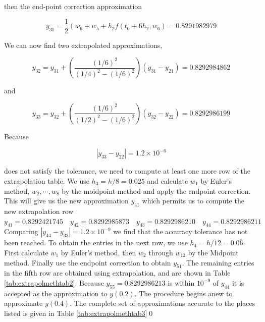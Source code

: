 \begin{mysolution}
then the end-point correction approximation

$$
y_{31}=\frac{1}{2}\left(w_{6}+w_{5}+h_{2} f\left(t_{0}+6 h_{2}, w_{6}\right)=0.8291982979\right.
$$

We can now find two extrapolated approximations,

$$
y_{32}=y_{31}+\left(\frac{(1 / 6)^{2}}{(1 / 4)^{2}-(1 / 6)^{2}}\right)\left(y_{31}-y_{21}\right)=0.8292984862
$$

and

$$
y_{33}=y_{32}+\left(\frac{(1 / 6)^{2}}{(1 / 2)^{2}-(1 / 6)^{2}}\right)\left(y_{32}-y_{22}\right)=0.8292986199
$$

Because

$$
\left|y_{33}-y_{22}\right|=1.2 \times 10^{-6}
$$

does not satisfy the tolerance, we need to compute at least one more row of the extrapolation table. We use $h_{3}=h / 8=0.025$ and calculate $w_{1}$ by Euler's method, $w_{2}, \cdots, w_{8}$ by the moidpoint method and apply the endpoint correction. This will give us the new approximation $y_{41}$ which permits us to compute the new extrapolation row\\
$y_{41}=0.8292421745 \quad y_{42}=0.8292985873 \quad y_{43}=0.8292986210 \quad y_{44}=0.8292986211$\\
Comparing $\left|y_{44}-y_{33}\right|=1.2 \times 10^{-9}$ we find that the accuracy tolerance has not been reached. To obtain the entries in the next row, we use $h_{4}=h / 12=0.0 \overline{6}$. First calculate $w_{1}$ by Euler's method, then $w_{2}$ through $w_{12}$ by the Midpoint method. Finally use the endpoint correction to obtain $y_{51}$. The remaining entries in the fifth row are obtained using extrapolation, and are shown in Table \ref{tab:extrapolmethtab2}. Because $y_{55}=0.8292986213$ is within $10^{-9}$ of $y_{44}$ it is accepted as the approximation to $y(0.2)$. The procedure begins anew to approximate $y(0.4)$. The complete set of approximations accurate to the places listed is given in Table \ref{tab:extrapolmethtab3}\qed
\end{mysolution}

